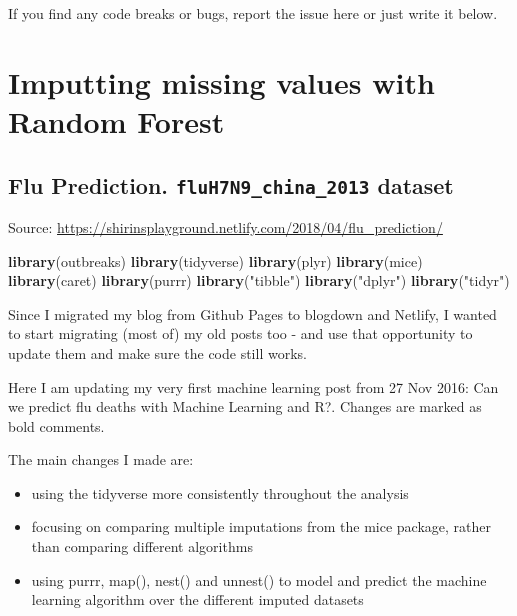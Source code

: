 \documentclass[]{book}
\newenvironment{Shaded}{\begin{snugshade}}{\end{snugshade}}
\newcommand{\KeywordTok}[1]{\textcolor[rgb]{0.13,0.29,0.53}{\textbf{#1}}}
\newcommand{\NormalTok}[1]{#1}
\newcommand{\StringTok}[1]{\textcolor[rgb]{0.31,0.60,0.02}{#1}}
\begin{document}
If you find any code breaks or bugs, report the issue here or just write it below.

\hypertarget{imputting-missing-values-with-random-forest}{%
\chapter{Imputting missing values with Random Forest}\label{imputting-missing-values-with-random-forest}}

\hypertarget{flu-prediction.-fluh7n9_china_2013-dataset}{%
\section{\texorpdfstring{Flu Prediction. \texttt{fluH7N9\_china\_2013} dataset}{Flu Prediction. fluH7N9\_china\_2013 dataset}}\label{flu-prediction.-fluh7n9_china_2013-dataset}}

Source: \url{https://shirinsplayground.netlify.com/2018/04/flu_prediction/}

\begin{Shaded}
\begin{Highlighting}[]
\KeywordTok{library}\NormalTok{(outbreaks)}
\KeywordTok{library}\NormalTok{(tidyverse)}
\KeywordTok{library}\NormalTok{(plyr)}
\KeywordTok{library}\NormalTok{(mice)}
\KeywordTok{library}\NormalTok{(caret)}
\KeywordTok{library}\NormalTok{(purrr)}
\KeywordTok{library}\NormalTok{(}\StringTok{"tibble"}\NormalTok{)}
\KeywordTok{library}\NormalTok{(}\StringTok{"dplyr"}\NormalTok{)}
\KeywordTok{library}\NormalTok{(}\StringTok{"tidyr"}\NormalTok{)}
\end{Highlighting}
\end{Shaded}

Since I migrated my blog from Github Pages to blogdown and Netlify, I wanted to start migrating (most of) my old posts too - and use that opportunity to update them and make sure the code still works.

Here I am updating my very first machine learning post from 27 Nov 2016: Can we predict flu deaths with Machine Learning and R?. Changes are marked as bold comments.

The main changes I made are:

\begin{itemize}
\item
  using the tidyverse more consistently throughout the analysis
\item
  focusing on comparing multiple imputations from the mice package, rather than comparing different algorithms
\item
  using purrr, map(), nest() and unnest() to model and predict the machine learning algorithm over the different imputed datasets
\end{itemize}
\end{document}
